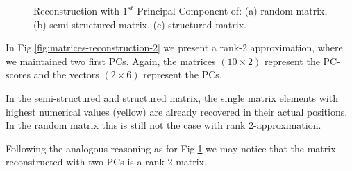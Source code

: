 \documentclass[10pt,twocolumn]{article}
\begin{document}
\begin{figure}[H]
\begin{subfigure}[t]{.15\textwidth}
\caption{ }
\end{subfigure}
\caption{Reconstruction with $1^{st}$ Principal Component of: (a) random matrix, (b) semi-structured matrix, (c) structured matrix.}
\label{fig:matrices-reconstruction-1}
\end{figure}

In Fig.\ref{fig:matrices-reconstruction-2} we present a rank-2 approximation, where we maintained two first PCs. Again, the matrices $(10 \times 2)$ represent the PC-scores and the vectors $(2 \times 6)$ represent the PCs.

In the semi-structured and structured matrix, the single matrix elements with highest numerical values (yellow) are already recovered in their actual positions. In the random matrix this is still not the case with rank 2-approximation.

Following the analogous reasoning as for Fig.\ref{fig:matrices-reconstruction-1} we may notice that the matrix reconstructed with two PCs is a rank-2 matrix.
\end{document}
